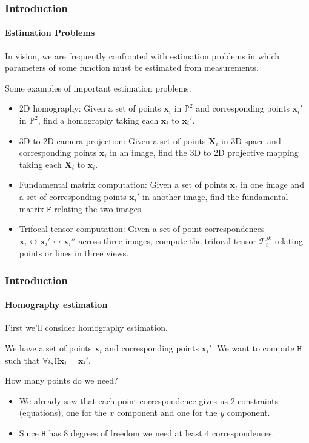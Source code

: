 \documentclass[aspectratio=169]{beamer}
\renewcommand{\vec}[1]{\boldsymbol{#1}}
\newcommand{\mat}[1]{\mathtt{#1}}
\newcommand{\ten}[1]{\mathcal{#1}}
\def\Pset{\mathbb{P}}
\begin{document}
\begin{frame}
\frametitle{Introduction}
\framesubtitle{Estimation Problems}

In vision, we are frequently confronted with \alert{estimation} problems
in which parameters of some function must be estimated from measurements.

\medskip

Some examples of important estimation problems:

\begin{itemize}
\item \alert{2D homography}: Given a set of points $\vec{x}_i$ in
  $\Pset^2$ and corresponding points $\vec{x}_i'$ in $\Pset^2$,
  find a homography taking each $\vec{x}_i$ to $\vec{x}_i'$.
\item \alert{3D to 2D camera projection}: Given a set of points
  $\vec{X}_i$ in 3D space and corresponding points $\vec{x}_i$
  in an image, find the 3D to 2D projective mapping taking each
  $\vec{X}_i$ to $\vec{x}_i$.
\item \alert{Fundamental matrix computation}: Given a set of
  points $\vec{x}_i$ in one image and a set of corresponding
  points $\vec{x}_i'$ in another image, find the fundamental
  matrix $\mat{F}$ relating the two images.
\item \alert{Trifocal tensor computation}: Given a set of
  point correspondences $\vec{x}_i \leftrightarrow \vec{x}_i'
  \leftrightarrow \vec{x}_i''$ across three images, compute the
  trifocal tensor $\ten{T}_i^{jk}$ relating points or lines in
  three views.
\end{itemize}

\end{frame}

\begin{frame}
\frametitle{Introduction}
\framesubtitle{Homography estimation}

First we'll consider homography estimation.

\medskip

We have a set of points $\vec{x}_i$ and corresponding points
$\vec{x}_i'$.  We want to compute $\mat{H}$ such that $\forall i,
\mat{H} \vec{x}_i = \vec{x}_i'$.

\medskip

How many points do we need?
\begin{itemize}
\item We already saw that each point
correspondence gives us 2 constraints (equations), one for the $x$
component and one for the $y$ component.
\item Since $\mat{H}$ has 8
degrees of freedom we need at least 4 correspondences.
\end{itemize}

\end{frame}
\end{document}
